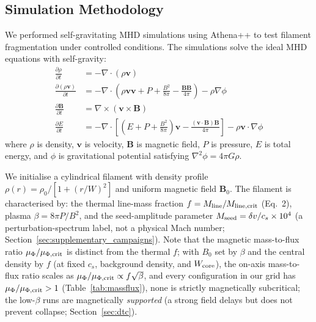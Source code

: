 \documentclass[usenatbib,twoside,twocolumn]{mnras}
\begin{document}
\subsection{Simulation Methodology}

We performed self-gravitating MHD simulations using Athena++ \citep{Stone2020} to test filament fragmentation under controlled conditions. The simulations solve the ideal MHD equations with self-gravity:
\begin{align}
\frac{\partial \rho}{\partial t} &= -\nabla \cdot (\rho \mathbf{v}) \\
\frac{\partial (\rho \mathbf{v})}{\partial t} &= -\nabla \cdot \left(\rho \mathbf{v} \mathbf{v} + P + \frac{B^2}{8\pi} - \frac{\mathbf{B}\mathbf{B}}{4\pi}\right) - \rho \nabla \phi \\
\frac{\partial \mathbf{B}}{\partial t} &= \nabla \times (\mathbf{v} \times \mathbf{B}) \\
\frac{\partial E}{\partial t} &= -\nabla \cdot \left[(E + P + \frac{B^2}{8\pi})\mathbf{v} - \frac{(\mathbf{v} \cdot \mathbf{B})\mathbf{B}}{4\pi}\right] - \rho \mathbf{v} \cdot \nabla \phi
\end{align}
where $\rho$ is density, $\mathbf{v}$ is velocity, $\mathbf{B}$ is magnetic field, $P$ is pressure, $E$ is total energy, and $\phi$ is gravitational potential satisfying $\nabla^2 \phi = 4\pi G\rho$.

We initialise a cylindrical filament with density profile $\rho(r) = \rho_0 / [1 + (r/W)^2]$ and uniform magnetic field $\mathbf{B}_0$. The filament is characterised by: the thermal line-mass fraction $f = M_{\rm line}/M_{\rm line,crit}$ (Eq.~2), plasma $\beta = 8\pi P/B^2$, and the seed-amplitude parameter $M_{\rm seed}=\delta v/c_s\times10^{4}$ (a perturbation-spectrum label, not a physical Mach number; Section~\ref{sec:supplementary_campaigns}). Note that the magnetic mass-to-flux ratio $\mu_\Phi/\mu_{\Phi,\rm crit}$ is distinct from the thermal $f$; with $B_0$ set by $\beta$ and the central density by $f$ (at fixed $c_s$, background density, and $W_{\rm core}$), the on-axis mass-to-flux ratio scales as $\mu_\Phi/\mu_{\Phi,\rm crit}\propto f\sqrt{\beta}$, and every configuration in our grid has $\mu_\Phi/\mu_{\Phi,\rm crit}>1$ (Table~\ref{tab:massflux}), none is strictly magnetically subcritical; the low-$\beta$ runs are magnetically \emph{supported} (a strong field delays but does not prevent collapse; Section~\ref{sec:dtc}).
\end{document}
